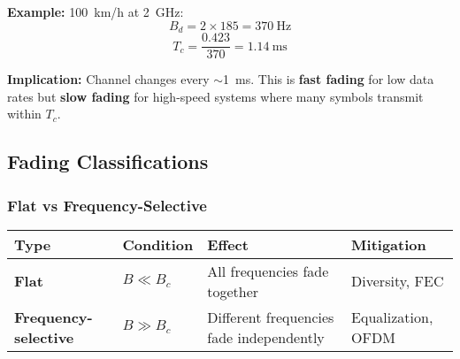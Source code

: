 \textbf{Example:} 100~km/h at 2~GHz:
\begin{equation}
B_d = 2 \times 185 = 370~\text{Hz}
\end{equation}
\begin{equation}
T_c = \frac{0.423}{370} = 1.14~\text{ms}
\end{equation}

\textbf{Implication:} Channel changes every $\sim$1~ms. This is \textbf{fast fading} for low data rates but \textbf{slow fading} for high-speed systems where many symbols transmit within $T_c$.

\subsection{Fading Classifications}\label{fading-classifications}

\subsubsection{Flat vs Frequency-Selective}\label{flat-vs-frequency-selective}

{\def\LTcaptype{} %
\begin{longtable}[]{@{}
  >{\raggedright\arraybackslash}p{}
  >{\raggedright\arraybackslash}p{}
  >{\raggedright\arraybackslash}p{}
  >{\raggedright\arraybackslash}p{}@{}}
\toprule\noalign{}
\begin{minipage}[b]{\linewidth}\raggedright
Type
\end{minipage} & \begin{minipage}[b]{\linewidth}\raggedright
Condition
\end{minipage} & \begin{minipage}[b]{\linewidth}\raggedright
Effect
\end{minipage} & \begin{minipage}[b]{\linewidth}\raggedright
Mitigation
\end{minipage} \\
\midrule\noalign{}
\endhead
\bottomrule\noalign{}
\endlastfoot
\textbf{Flat} & \(B \ll B_c\) & All frequencies fade together &
Diversity, FEC \\
\textbf{Frequency-selective} & \(B \gg B_c\) & Different frequencies
fade independently & Equalization, OFDM \\
\end{longtable}
}

